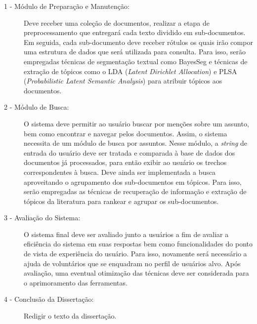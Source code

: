 \begin{description}

	\item[1 - Módulo de Preparação e Manutenção:] Deve receber uma coleção de documentos, realizar a etapa de  preprocessamento que entregará cada texto dividido em sub-documentos. Em seguida, cada sub-documento deve receber rótulos os quais irão compor uma estrutura de dados que será utilizada para consulta.
%	
Para isso, serão empregadas técnicas de segmentação textual como BayesSeg e técnicas de extração de tópicos como o LDA (\textit{Latent Dirichlet Allocation}) e PLSA (\textit{Probabilistic Latent Semantic Analysis}) para atribuir tópicos aos documentos.


	
		
	\item[2 - Módulo de Busca:] O sistema deve permitir ao usuário buscar por menções sobre um assunto, bem como encontrar e navegar pelos documentos. Assim, o sistema necessita de um módulo de busca por assuntos. Nesse módulo, a \textit{string} de entrada do usuário deve ser tratada e comparada à base de dados dos documentos já processados, para então exibir ao usuário os trechos correspondentes à busca. 
Deve ainda ser implementada a busca aproveitando o agrupamento dos sub-documentos em tópicos. Para isso, serão empregadas as técnicas de recuperação de informação e
extração de tópicos da literatura para rankear e agrupar os sub-documentos.

	
	
	\item[3 - Avaliação do Sistema:] O sistema final deve ser avaliado junto a usuários a fim de avaliar a eficiência do sistema em suas respostas bem como funcionalidades do ponto de vista de experiência do usuário. 
%
Para isso, novamente será necessário a ajuda de voluntários que se enquadram no perfil de usuários alvo.
%	
	Após avaliação, uma eventual otimização das técnicas deve ser considerada para o aprimoramento das ferramentas.
	
	
	\item[4 - Conclusão da Dissertação:] Redigir o texto da dissertação.
	
		

\end{description}



